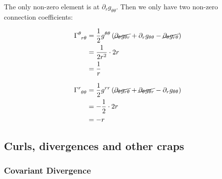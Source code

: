 The only non-zero element is at $\partial_r g_{\theta \theta}$. Then we only have two non-zero connection coefficients:
\begin{minipage}[t]{0.48\textwidth}
\begin{align*}
\tensor{\Gamma}{^\theta _{r\theta}} &= \frac{1}{2}g^{\theta \theta}\left(\cancel{\partial_\theta g_{\theta r}} + \partial_r g_{\theta \theta} - \cancel{\partial_\theta g_{r \theta}}\right) \\
&= \frac{1}{2r^2} \cdot 2r \\
&= \frac{1}{r}
\end{align*}
\end{minipage}
\hfill
\begin{minipage}[t]{0.48\textwidth}
\begin{align*}
\tensor{\Gamma}{^r _{\theta \theta}} &= \frac{1}{2}g^{r r}\left(\cancel{\partial_\theta g_{r \theta}} + \cancel{\partial_\theta g_{\theta r}} - \partial_r g_{\theta \theta}\right) \\
&= -\frac{1}{2} \cdot 2r \\
&= -r
\end{align*}
\end{minipage}
\subsection{Curls, divergences and other craps}
\subsubsection{Covariant Divergence}

